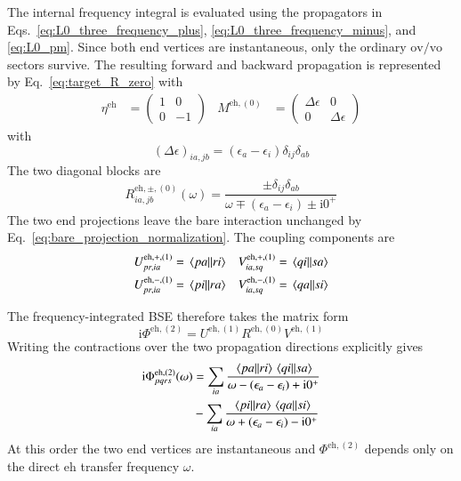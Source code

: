\documentclass[aip,jcp,reprint,noshowkeys,superscriptaddress]{revtex4-1}
\newcommand{\eps}{\epsilon}
\newcommand{\ii}{\mathrm{i}}
\newcommand{\eh}{\text{eh}}
\begin{document}
The internal frequency integral is evaluated using the propagators in
Eqs.~\eqref{eq:L0_three_frequency_plus},
\eqref{eq:L0_three_frequency_minus}, and \eqref{eq:L0_pm}.
Since both end vertices are instantaneous, only the ordinary
$\text{ov}/\text{vo}$ sectors survive. The resulting forward and backward
propagation is represented by Eq.~\eqref{eq:target_R_zero} with
\begin{align}
	\eta^\eh
	&=
	\begin{pmatrix}
	1&0
	\\
	0&-1
	\end{pmatrix}
	&
	M^{\eh,(0)}
	&=
	\begin{pmatrix}
	\Delta\eps&0
	\\
	0&\Delta\eps
	\end{pmatrix}
	\label{eq:eta_M_eh_zero}
\end{align}
with
\begin{equation}
	(\Delta\eps)_{ia,jb}
	=
	(\eps_a-\eps_i)\delta_{ij}\delta_{ab}
	\label{eq:Delta_eh}
\end{equation}
The two diagonal blocks are
\begin{equation}
    R^{\eh,\pm,(0)}_{ia,jb}(\omega)
    =\frac{\pm\delta_{ij}\delta_{ab}}
    {\omega\mp(\eps_a-\eps_i)\pm\ii0^+}
    \label{eq:R_eh_zero}
\end{equation}
The two end projections leave the bare interaction unchanged by
Eq.~\eqref{eq:bare_projection_normalization}. The coupling components are
\begin{align}
	U^{\eh,+,(1)}_{pr,ia}
	&=
	\mel{pa}{}{ri}
	&
	V^{\eh,+,(1)}_{ia,sq}
	&=
	\mel{qi}{}{sa}
	\label{eq:UV_eh_first_plus}
	\\
	U^{\eh,-,(1)}_{pr,ia}
	&=
	\mel{pi}{}{ra}
	&
	V^{\eh,-,(1)}_{ia,sq}
	&=
	\mel{qa}{}{si}
	\label{eq:UV_eh_first_minus}
\end{align}

The frequency-integrated BSE therefore takes the matrix form
\begin{equation}
	\ii\Phi^{\eh,(2)}
	=
	U^{\eh,(1)}R^{\eh,(0)}V^{\eh,(1)}
	\label{eq:Phi_eh_second_resolvent}
\end{equation}
Writing the contractions over the two propagation directions explicitly gives
\begin{equation}
	\begin{split}
	\ii\Phi^{\eh,(2)}_{pqrs}(\omega)
	&=
	\sum_{ia}
	\frac{
	\mel{pa}{}{ri}
	\mel{qi}{}{sa}
	}
	{\omega-(\eps_a-\eps_i)+\ii0^+}
	\\
	&-
	\sum_{ia}
	\frac{
	\mel{pi}{}{ra}
	\mel{qa}{}{si}
	}
	{\omega+(\eps_a-\eps_i)-\ii0^+}
	\end{split}
	\label{eq:Phi_eh_second}
\end{equation}
At this order the two end vertices are instantaneous and
$\Phi^{\eh,(2)}$ depends only on the direct $\eh$ transfer
frequency $\omega$.
\end{document}
